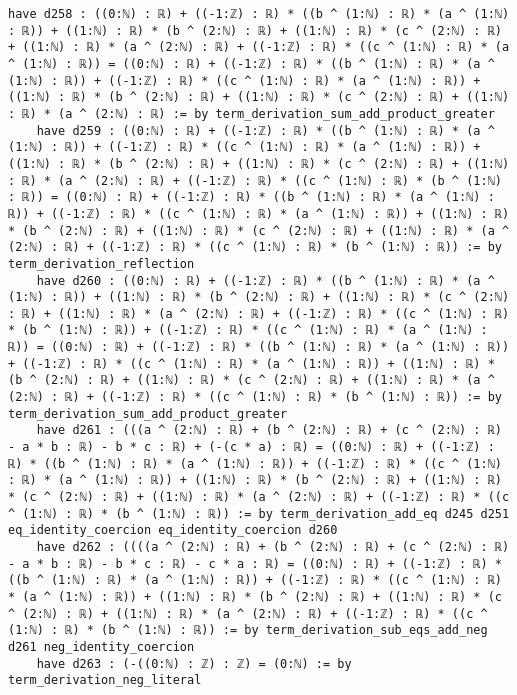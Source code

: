 \documentclass{article}
\begin{document}
\begin{tcolorbox}[colback=white!10, width=\linewidth]
\begin{lstlisting}[language=Lean4]
    have d258 : ((0:ℕ) : ℝ) + ((-1:ℤ) : ℝ) * ((b ^ (1:ℕ) : ℝ) * (a ^ (1:ℕ) : ℝ)) + ((1:ℕ) : ℝ) * (b ^ (2:ℕ) : ℝ) + ((1:ℕ) : ℝ) * (c ^ (2:ℕ) : ℝ) + ((1:ℕ) : ℝ) * (a ^ (2:ℕ) : ℝ) + ((-1:ℤ) : ℝ) * ((c ^ (1:ℕ) : ℝ) * (a ^ (1:ℕ) : ℝ)) = ((0:ℕ) : ℝ) + ((-1:ℤ) : ℝ) * ((b ^ (1:ℕ) : ℝ) * (a ^ (1:ℕ) : ℝ)) + ((-1:ℤ) : ℝ) * ((c ^ (1:ℕ) : ℝ) * (a ^ (1:ℕ) : ℝ)) + ((1:ℕ) : ℝ) * (b ^ (2:ℕ) : ℝ) + ((1:ℕ) : ℝ) * (c ^ (2:ℕ) : ℝ) + ((1:ℕ) : ℝ) * (a ^ (2:ℕ) : ℝ) := by term_derivation_sum_add_product_greater
    have d259 : ((0:ℕ) : ℝ) + ((-1:ℤ) : ℝ) * ((b ^ (1:ℕ) : ℝ) * (a ^ (1:ℕ) : ℝ)) + ((-1:ℤ) : ℝ) * ((c ^ (1:ℕ) : ℝ) * (a ^ (1:ℕ) : ℝ)) + ((1:ℕ) : ℝ) * (b ^ (2:ℕ) : ℝ) + ((1:ℕ) : ℝ) * (c ^ (2:ℕ) : ℝ) + ((1:ℕ) : ℝ) * (a ^ (2:ℕ) : ℝ) + ((-1:ℤ) : ℝ) * ((c ^ (1:ℕ) : ℝ) * (b ^ (1:ℕ) : ℝ)) = ((0:ℕ) : ℝ) + ((-1:ℤ) : ℝ) * ((b ^ (1:ℕ) : ℝ) * (a ^ (1:ℕ) : ℝ)) + ((-1:ℤ) : ℝ) * ((c ^ (1:ℕ) : ℝ) * (a ^ (1:ℕ) : ℝ)) + ((1:ℕ) : ℝ) * (b ^ (2:ℕ) : ℝ) + ((1:ℕ) : ℝ) * (c ^ (2:ℕ) : ℝ) + ((1:ℕ) : ℝ) * (a ^ (2:ℕ) : ℝ) + ((-1:ℤ) : ℝ) * ((c ^ (1:ℕ) : ℝ) * (b ^ (1:ℕ) : ℝ)) := by term_derivation_reflection
    have d260 : ((0:ℕ) : ℝ) + ((-1:ℤ) : ℝ) * ((b ^ (1:ℕ) : ℝ) * (a ^ (1:ℕ) : ℝ)) + ((1:ℕ) : ℝ) * (b ^ (2:ℕ) : ℝ) + ((1:ℕ) : ℝ) * (c ^ (2:ℕ) : ℝ) + ((1:ℕ) : ℝ) * (a ^ (2:ℕ) : ℝ) + ((-1:ℤ) : ℝ) * ((c ^ (1:ℕ) : ℝ) * (b ^ (1:ℕ) : ℝ)) + ((-1:ℤ) : ℝ) * ((c ^ (1:ℕ) : ℝ) * (a ^ (1:ℕ) : ℝ)) = ((0:ℕ) : ℝ) + ((-1:ℤ) : ℝ) * ((b ^ (1:ℕ) : ℝ) * (a ^ (1:ℕ) : ℝ)) + ((-1:ℤ) : ℝ) * ((c ^ (1:ℕ) : ℝ) * (a ^ (1:ℕ) : ℝ)) + ((1:ℕ) : ℝ) * (b ^ (2:ℕ) : ℝ) + ((1:ℕ) : ℝ) * (c ^ (2:ℕ) : ℝ) + ((1:ℕ) : ℝ) * (a ^ (2:ℕ) : ℝ) + ((-1:ℤ) : ℝ) * ((c ^ (1:ℕ) : ℝ) * (b ^ (1:ℕ) : ℝ)) := by term_derivation_sum_add_product_greater
    have d261 : (((a ^ (2:ℕ) : ℝ) + (b ^ (2:ℕ) : ℝ) + (c ^ (2:ℕ) : ℝ) - a * b : ℝ) - b * c : ℝ) + (-(c * a) : ℝ) = ((0:ℕ) : ℝ) + ((-1:ℤ) : ℝ) * ((b ^ (1:ℕ) : ℝ) * (a ^ (1:ℕ) : ℝ)) + ((-1:ℤ) : ℝ) * ((c ^ (1:ℕ) : ℝ) * (a ^ (1:ℕ) : ℝ)) + ((1:ℕ) : ℝ) * (b ^ (2:ℕ) : ℝ) + ((1:ℕ) : ℝ) * (c ^ (2:ℕ) : ℝ) + ((1:ℕ) : ℝ) * (a ^ (2:ℕ) : ℝ) + ((-1:ℤ) : ℝ) * ((c ^ (1:ℕ) : ℝ) * (b ^ (1:ℕ) : ℝ)) := by term_derivation_add_eq d245 d251 eq_identity_coercion eq_identity_coercion d260
    have d262 : ((((a ^ (2:ℕ) : ℝ) + (b ^ (2:ℕ) : ℝ) + (c ^ (2:ℕ) : ℝ) - a * b : ℝ) - b * c : ℝ) - c * a : ℝ) = ((0:ℕ) : ℝ) + ((-1:ℤ) : ℝ) * ((b ^ (1:ℕ) : ℝ) * (a ^ (1:ℕ) : ℝ)) + ((-1:ℤ) : ℝ) * ((c ^ (1:ℕ) : ℝ) * (a ^ (1:ℕ) : ℝ)) + ((1:ℕ) : ℝ) * (b ^ (2:ℕ) : ℝ) + ((1:ℕ) : ℝ) * (c ^ (2:ℕ) : ℝ) + ((1:ℕ) : ℝ) * (a ^ (2:ℕ) : ℝ) + ((-1:ℤ) : ℝ) * ((c ^ (1:ℕ) : ℝ) * (b ^ (1:ℕ) : ℝ)) := by term_derivation_sub_eqs_add_neg d261 neg_identity_coercion
    have d263 : (-((0:ℕ) : ℤ) : ℤ) = (0:ℕ) := by term_derivation_neg_literal

\end{lstlisting}
\end{tcolorbox}
\end{document}
